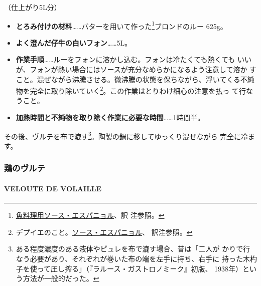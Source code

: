 \begin{recette}
    

（仕上がり5L分）

\begin{itemize}
\item
  \textbf{とろみ付けの材料}\ldots{}\ldots{}バターを用いて作った\footnote{\protect\hyperlink{sauce-espagnole-maigre}{魚料理用ソース・エスパニョル}、訳
    注参照。}ブロンドのルー 625g。
\item
  \textbf{よく澄んだ仔牛の白いフォン}\ldots{}\ldots{}5L。
\item
  \textbf{作業手順}\ldots{}\ldots{}ルーをフォンに溶かし込む。フォンは冷たくても熱くても
  いいが、フォンが熱い場合にはソースが充分なめらかになるよう注意して溶か
  すこと。混ぜながら沸騰させる。微沸騰の状態を保ちながら、浮いてくる不純
  物を完全に取り除いていく\footnote{デプイエのこと。\protect\hyperlink{sauce-espagnole}{ソース・エスパニョル}、
    訳注参照。}。この作業はとりわけ細心の注意を払っ て行なうこと。
\item
  \textbf{加熱時間と不純物を取り除く作業に必要な時間}\ldots{}\ldots{}1時間半。
\end{itemize}

その後、ヴルテを布で漉す\footnote{ある程度濃度のある液体やピュレを布で漉す場合、昔は「二人が
  かりで行なう必要があり、それぞれが巻いた布の端を左手に持ち、右手に
  持った木杓子を使って圧し搾る」（『ラルース・ガストロノミーク』初版、
  1938年）という方法が一般的だった。}。陶製の鍋に移してゆっくり混ぜながら
完全に冷ます。

\maeaki

\hypertarget{ux9d8fux306eux30f4ux30ebux30c6}{%
\subsubsection{鶏のヴルテ}\label{ux9d8fux306eux30f4ux30ebux30c6}}

\hypertarget{veloute-de-volaille}{%
\paragraph{VELOUTE DE VOLAILLE}\label{veloute-de-volaille}}

   
 


\end{recette}
